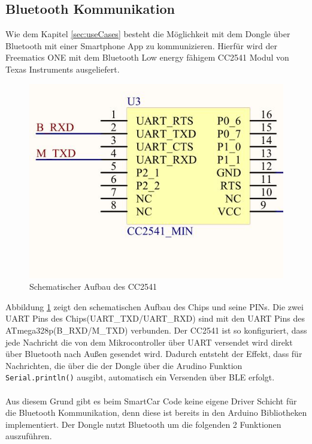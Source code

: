\subsection{Bluetooth Kommunikation}
\label{sec:Bluetooth}
Wie dem Kapitel \ref{sec:useCases} besteht die Möglichkeit mit dem Dongle über Bluetooth mit einer Smartphone App zu kommunizieren. Hierfür wird der Freematics ONE mit dem Bluetooth Low energy fähigem CC2541 Modul von Texas Instruments ausgeliefert.
\begin{figure}[h]
  \begin{center}
    \includegraphics[scale=0.5]{./img/BLEChip.jpg}
    \caption{Schematischer Aufbau des CC2541\cite{Freematics2016}}
    \label{fig:BLEChip}
  \end{center}
\end{figure} 
Abbildung \ref{fig:BLEChip} zeigt den schematischen Aufbau des Chips und seine PINs. Die zwei UART Pins des Chips(UART\_TXD/UART\_RXD) sind mit den UART Pins des ATmega328p(B\_RXD/M\_TXD) verbunden. Der CC2541 ist so konfiguriert, dass jede Nachricht die von dem Mikrocontroller über UART versendet wird direkt über Bluetooth nach Außen gesendet wird. Dadurch entsteht der Effekt, dass für Nachrichten, die über die der Dongle über die Arudino Funktion \texttt{Serial.println()} ausgibt, automatisch ein Versenden über BLE erfolgt.
\paragraph{}{}
Aus diesem Grund gibt es beim SmartCar Code keine eigene Driver Schicht für die Bluetooth Kommunikation, denn diese ist bereits in den Arduino Bibliotheken implementiert. Der Dongle nutzt Bluetooth um die folgenden 2 Funktionen auszuführen.
